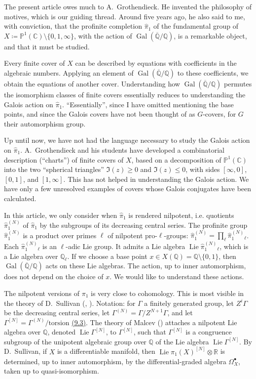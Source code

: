 \documentclass{article}
\theoremstyle{definition}
\newcommand{\bb}{\mathbb}
\newcommand{\PP}{\bb{P}}
\newcommand{\RR}{\bb{R}}
\newcommand{\CC}{\bb{C}}
\newcommand{\QQ}{\bb{Q}}
\newcommand{\cQQ}{\overline{\QQ}}
\renewcommand{\geq}{\geqslant}
\renewcommand{\leq}{\leqslant}
\DeclareMathOperator{\Gal}{Gal}
\DeclareMathOperator{\Lie}{Lie}
\newcommand{\oldpage}[1]{\marginpar{\footnotesize$\Big\vert$ \textit{p.~#1}}}
\begin{document}
\oldpage{3~(81)}
The present article owes much to A.~Grothendieck.
He invented the philosophy of motives, which is our guiding thread.
Around five years ago, he also said to me, with conviction, that the profinite completion $\hat{\pi}_1$ of the fundamental group of $X\coloneqq\PP^1(\CC)\setminus\{0,1,\infty\}$, with the action of $\Gal(\cQQ/\QQ)$, is a remarkable object, and that it must be studied.

Every finite cover of $X$ can be described by equations with coefficients in the algebraic numbers.
Applying an element of $\Gal(\cQQ/\QQ)$ to these coefficients, we obtain the equations of another cover.
Understanding how $\Gal(\cQQ/\QQ)$ permutes the isomorphism classes of finite covers essentially reduces to understanding the Galois action on $\hat{\pi}_1$.
``Essentially'', since I have omitted mentioning the base points, and since the Galois covers have not been thought of as $G$-covers, for $G$ their automorphism group.

Up until now, we have not had the language necessary to study the Galois action on $\hat{\pi}_1$.
A.~Grothendieck and his students have developed a combinatorial description (``charts'') of finite covers of $X$, based on a decomposition of $\PP^1(\CC)$ into the two ``spherical triangles'' $\Im(z)\geq0$ and $\Im(z)\leq0$, with sides $[\infty,0]$, $[0,1]$, and $[1,\infty]$.
This has not helped in understanding the Galois action.
We have only a few unresolved examples of covers whose Galois conjugates have been calculated.

In this article, we only consider when $\hat{\pi}_1$ is rendered nilpotent, i.e. quotients $\hat{\pi}_1^{(N)}$ of $\hat{\pi}_1$ by the subgroups of its decreasing central series.
The profinite group $\hat{\pi}_1^{(N)}$ is a product over primes $\ell$ of nilpotent pro-$\ell$-groups: $\hat{\pi}_1^{(N)} = \prod_\ell \hat{\pi}_1^{(N)}{}\!_\ell$.
Each $\hat{\pi}_1^{(N)}{}\!_\ell$ is an $\ell$-adic Lie group.
It admits a Lie algebra $\Lie\hat{\pi}_1^{(N)}{}\!_\ell$, which is a Lie algebra over $\QQ_\ell$.
If we choose a base point $x\in X(\QQ)=\QQ\setminus\{0,1\}$, then $\Gal(\cQQ/\QQ)$ acts on these Lie algebras.
The action, up to inner automorphism, does not depend on the choice of $x$.
We would like to understand these actions.

The nilpotent versions of $\pi_1$ is very close to cohomology.
This is most visible in the theory of D.~Sullivan (\cite{Su}, \cite{Mo}).
Notation: for $\Gamma$ a finitely generated group, let $Z^i\Gamma$ be the decreasing central series, let $\Gamma^{(N)}=\Gamma/Z^{N+1}\Gamma$, and let $\Gamma^{[N]}=\Gamma^{(N)}/\mathrm{torsion}$ \hyperref[9.3]{(9.3)}.
The theory of Malcev (\cite{Mal}) attaches a nilpotent Lie algebra over $\QQ$, denoted $\Lie\Gamma^{[N]}$, to $\Gamma^{[N]}$, such that $\Gamma^{[N]}$ is a congruence subgroup of the unipotent algebraic group over $\QQ$ of the Lie algebra $\Lie\Gamma^{[N]}$.
By D.~Sullivan, if $X$ is a differentiable manifold, then $\Lie\pi_1(X)^{[N]}\otimes\RR$ is determined, up to inner automorphism, by the differential-graded algebra $\Omega_X^\bullet$, taken
\oldpage{4~(82)}
up to quasi-isomorphism.
\end{document}

